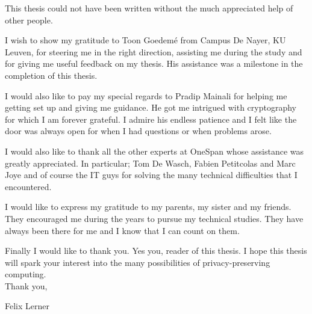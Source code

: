 This thesis could not have been written without the much appreciated help of other people.

I wish to show my gratitude to Toon Goedem{\'e} from Campus De Nayer, KU Leuven, for steering me in the right direction, assisting me during the study and for giving me useful feedback on my thesis. His assistance was a milestone in the completion of this thesis.

I would also like to pay my special regards to Pradip Mainali for helping me getting set up and giving me guidance. He got me intrigued with cryptography for which I am forever grateful. I admire his endless patience and I felt like the door was always open for when I had questions or when problems arose.

 I would also like to thank all the other experts at OneSpan whose assistance was greatly appreciated. In particular; Tom De Wasch, Fabien Petitcolas and Marc Joye and of course the IT guys for solving the many technical difficulties that I encountered.

I would like to express my gratitude to my parents, my sister and my friends. They encouraged me during the years to pursue my technical studies. They have always been there for me and I know that I can count on them.

Finally I would like to thank you. Yes you, reader of this thesis. I hope this thesis will spark your interest into the many possibilities of privacy-preserving computing.\\

Thank you,

Felix Lerner
